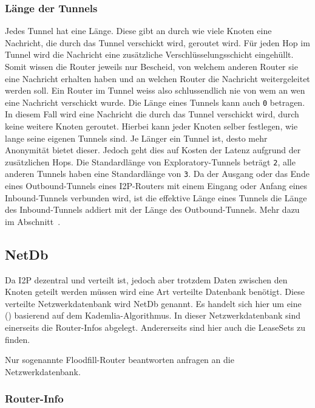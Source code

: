 \subsubsection{Länge der Tunnels}

Jedes Tunnel hat eine Länge.
Diese gibt an durch wie viele Knoten eine Nachricht, die durch das Tunnel verschickt wird, geroutet wird.
Für jeden Hop im Tunnel wird die Nachricht eine zusätzliche Verschlüsselungsschicht eingehüllt.
Somit wissen die Router jeweils nur Bescheid, von welchem anderen Router sie eine Nachricht erhalten haben und an welchen Router die Nachricht weitergeleitet werden soll.
Ein Router im Tunnel weiss also schlussendlich nie von wem an wen eine Nachricht verschickt wurde.
Die Länge eines Tunnels kann auch \lstinline|0| betragen.
In diesem Fall wird eine Nachricht die durch das Tunnel verschickt wird, durch keine weitere Knoten geroutet.
Hierbei kann jeder Knoten selber festlegen, wie lange seine eigenen Tunnels sind.
Je Länger ein Tunnel ist, desto mehr Anonymität bietet dieser.
Jedoch geht dies auf Kosten der Latenz aufgrund der zusätzlichen Hops.
Die Standardlänge von Exploratory-Tunnels beträgt \lstinline|2|, alle anderen Tunnels haben eine Standardlänge von \lstinline|3|.
Da der Ausgang oder das Ende eines Outbound-Tunnels eines I2P-Routers mit einem Eingang oder Anfang eines Inbound-Tunnels verbunden wird,
ist die effektive Länge eines Tunnels die Länge des Inbound-Tunnels addiert mit der Länge des Outbound-Tunnels. Mehr dazu im Abschnitt~.
\cite{noauthor_i2p_nodate-3}

\subsection{NetDb}\label{sec:netdb}

Da I2P dezentral und verteilt ist, jedoch aber trotzdem Daten zwischen den Knoten geteilt werden müssen wird eine Art verteilte Datenbank benötigt.
Diese verteilte Netzwerkdatenbank wird NetDb genannt.
Es handelt sich hier um eine  () basierend auf dem Kademlia-Algorithmus.
In dieser Netzwerkdatenbank sind einerseits die Router-Infos abgelegt.
Andererseits sind hier auch die LeaseSets zu finden.
\parencite{author_network_nodate}

Nur sogenannte Floodfill-Router beantworten anfragen an die Netzwerkdatenbank.
\parencite[S.~5-6]{timpanaro_monitoring_nodate}

\subsubsection{Router-Info}\label{sec:router_info}

